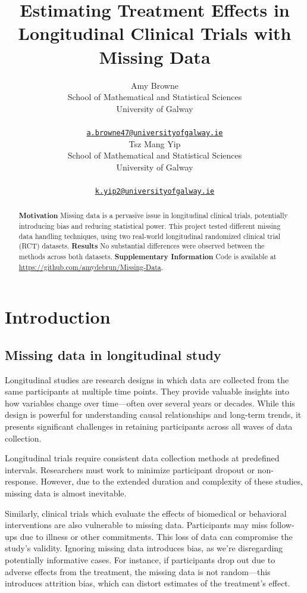 \documentclass{article}
\title{Estimating Treatment Effects in Longitudinal Clinical Trials with
Missing Data}
\author{
    Amy Browne
   \\
    School of Mathematical and Statistical Sciences \\
    University of Galway \\
   \\
  \texttt{\href{mailto:a.browne47@universityofgalway.ie}{\nolinkurl{a.browne47@universityofgalway.ie}}} \\
   \And
    Tsz Mang Yip
   \\
    School of Mathematical and Statistical Sciences \\
    University of Galway \\
   \\
  \texttt{\href{mailto:k.yip2@universityofgalway.ie}{\nolinkurl{k.yip2@universityofgalway.ie}}} \\
  }
\begin{document}
\maketitle


\begin{abstract}
\textbf{Motivation} Missing data is a pervasive issue in longitudinal
clinical trials, potentially introducing bias and reducing statistical
power. This project tested different missing data handling techniques,
using two real-world longitudinal randomized clinical trial (RCT)
datasets. \textbf{Results} No substantial differences were observed
between the methods across both datasets.
\textbf{Supplementary Information} Code is available at
\url{https://github.com/amydebrun/Missing-Data}.
\end{abstract}


\section{Introduction}\label{introduction}

\subsection{Missing data in longitudinal
study}\label{missing-data-in-longitudinal-study}

Longitudinal studies are research designs in which data are collected
from the same participants at multiple time points. They provide
valuable insights into how variables change over time---often over
several years or decades. While this design is powerful for
understanding causal relationships and long-term trends, it presents
significant challenges in retaining participants across all waves of
data collection.

Longitudinal trials require consistent data collection methods at
predefined intervals. Researchers must work to minimize participant
dropout or non-response. However, due to the extended duration and
complexity of these studies, missing data is almost inevitable.

Similarly, clinical trials which evaluate the effects of biomedical or
behavioral interventions are also vulnerable to missing data.
Participants may miss follow-ups due to illness or other commitments.
This loss of data can compromise the study's validity. Ignoring missing
data introduces bias, as we're disregarding potentially informative
cases. For instance, if participants drop out due to adverse effects
from the treatment, the missing data is not random---this introduces
attrition bias, which can distort estimates of the treatment's effect.
\end{document}
